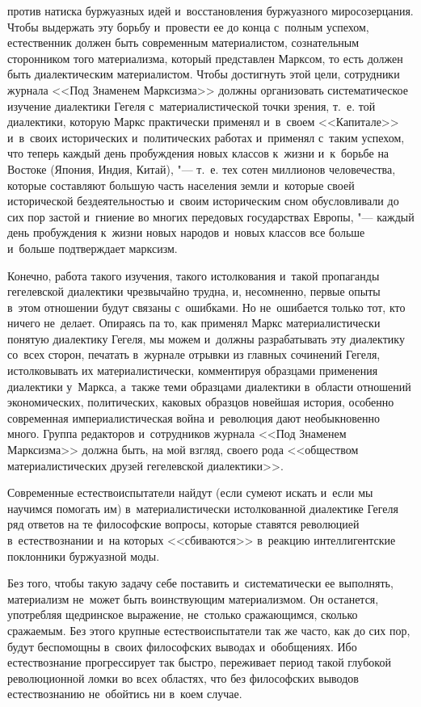 против натиска буржуазных идей и~восстановления буржуазного миросозерцания. Чтобы выдержать эту борьбу и~провести ее до конца с~полным успехом, естественник должен быть современным материалистом, сознательным сторонником того материализма, который представлен Марксом, то есть должен быть диалектическим материалистом. Чтобы достигнуть этой цели, сотрудники журнала <<Под Знаменем Марксизма>> должны организовать систематическое изучение диалектики Гегеля с~материалистической точки зрения, т.~е. той диалектики, которую Маркс практически применял и~в~своем <<Капитале>> и~в~своих исторических и~политических работах и~применял с~таким успехом, что теперь каждый день пробуждения новых классов к~жизни и~к~борьбе на Востоке (Япония, Индия, Китай), "--- т.~е. тех сотен миллионов человечества, которые составляют большую часть населения земли и~которые своей исторической бездеятельностью и~своим историческим сном обусловливали до сих пор застой и~гниение во многих передовых государствах Европы, "--- каждый день пробуждения к~жизни новых народов и~новых классов все больше и~больше подтверждает марксизм.

Конечно, работа такого изучения, такого истолкования и~такой пропаганды гегелевской диалектики чрезвычайно трудна, и, несомненно, первые опыты в~этом отношении будут связаны с~ошибками. Но не~ошибается только тот, кто ничего не~делает. Опираясь па то, как применял Маркс материалистически понятую диалектику Гегеля, мы можем и~должны разрабатывать эту диалектику со~всех сторон, печатать в~журнале отрывки из главных сочинений Гегеля, истолковывать их материалистически, комментируя образцами применения диалектики у~Маркса, а~также теми образцами диалектики в~области отношений экономических, политических, каковых образцов новейшая история, особенно современная империалистическая война и~революция дают необыкновенно много. Группа редакторов и~сотрудников журнала <<Под Знаменем Марксизма>> должна быть, на мой взгляд, своего рода <<обществом материалистических друзей гегелевской диалектики>>.

Современные естествоиспытатели найдут (если сумеют искать и~если мы научимся помогать им) в~материалистически истолкованной диалектике Гегеля ряд ответов на те философские вопросы, которые ставятся революцией в~естествознании и~на которых <<сбиваются>> в~реакцию интеллигентские поклонники буржуазной моды.

Без того, чтобы такую задачу себе поставить и~систематически ее выполнять, материализм не~может быть воинствующим материализмом. Он останется, употребляя щедринское выражение, не~столько сражающимся, сколько сражаемым. Без этого крупные естествоиспытатели так же часто, как до сих пор, будут беспомощны в~своих философских выводах и~обобщениях. Ибо естествознание прогрессирует так быстро, переживает период такой глубокой революционной ломки во всех областях, что без философских выводов естествознанию не~обойтись ни в~коем случае.

